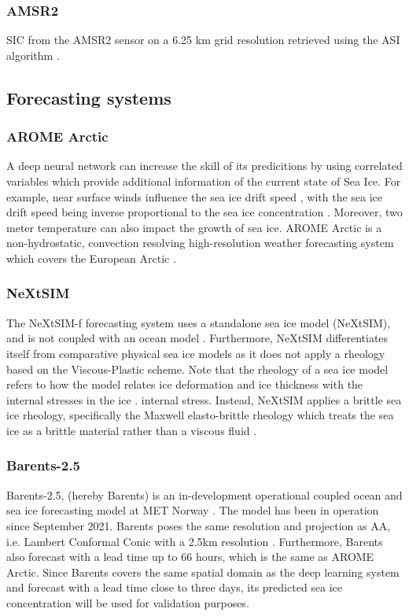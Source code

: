 \documentclass[../main/thesis.tex]{subfiles}
\begin{document}
\subsubsection{AMSR2}
SIC from the AMSR2 sensor on a 6.25 km grid resolution retrieved using the ASI algorithm \cite{Spreen2008}. 


\subsection{Forecasting systems}
 
\subsubsection{AROME Arctic}
A deep neural network can increase the skill of its predicitions by using correlated variables which provide additional information of the current state of Sea Ice.  For example, near surface winds influence the sea ice drift speed \cite{Spreen2011}, with the sea ice drift speed being inverse proportional to the sea ice concentration \cite{Yu2020}. Moreover, two meter temperature can also impact the growth of sea ice. AROME Arctic is a non-hydrostatic, convection resolving high-resolution weather forecasting system which covers the European Arctic \cite{Mueller2017}.




\subsubsection{NeXtSIM}
The NeXtSIM-f forecasting system uses a standalone sea ice model (NeXtSIM), and is not coupled with an ocean model \cite{Williams2021}. Furthermore, NeXtSIM differentiates itself from comparative physical sea ice models as it does not apply a rheology based on the Viscous-Plastic scheme. Note that the rheology of a sea ice model refers to how the model relates ice deformation and ice thickness with the internal stresses in the ice \cite{Hibler1979}. internal stress. Instead, NeXtSIM applies a brittle sea ice rheology, specifically the Maxwell elasto-brittle rheology which treats the sea ice as a brittle material rather than a viscous fluid \cite{Dansereau2016}.


\subsubsection{Barents-2.5}
Barents-2.5, (hereby Barents) is an in-development operational coupled ocean and sea ice forecasting model at MET Norway \cite{Roehrs2022}. The model has been in operation since September 2021. Barents poses the same resolution and projection as AA, i.e. Lambert Conformal Conic with a 2.5km resolution \cite{Roehrs2022,Mueller2017}. Furthermore, Barents also forecast with a lead time up to 66 hours, which is the same as AROME Arctic. Since Barents covers the same spatial domain as the deep learning system and forecast with a lead time close to three days, its predicted sea ice concentration will be used for validation purposes.
\end{document}
